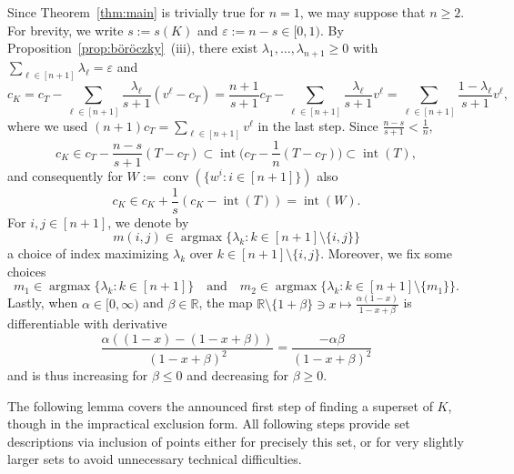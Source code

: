 \documentclass{amsart}
\newcommand\R{\mathbb{R}}
\DeclareMathOperator{\conv}{conv}
\DeclareMathOperator{\inte}{int}
\DeclareMathOperator{\argmax}{argmax}
\begin{document}
Since Theorem~\ref{thm:main} is trivially true for $n = 1$, we may suppose that $n \geq 2$.
For brevity, we write $s := s(K)$ and $\varepsilon := n - s \in [0,1)$.
By Proposition~\ref{prop:böröczky}~(iii),
there exist $\lambda_1, \dots, \lambda_{n+1} \geq 0$ with $\sum_{\ell \in [n+1]} \lambda_\ell = \varepsilon$ and
\begin{equation}\label{eq:c_K}
	c_K
	= c_T - \sum_{\ell \in [n+1]} \frac{\lambda_\ell}{s+1} (v^\ell - c_T)
	= \frac{n+1}{s+1} c_T - \sum_{\ell \in [n+1]} \frac{\lambda_\ell}{s+1} v^\ell
	= \sum_{\ell \in [n+1]} \frac{1 - \lambda_\ell}{s+1} v^\ell,
\end{equation}
where we used $(n+1) c_T = \sum_{\ell \in [n+1]} v^\ell$ in the last step.
Since $\frac{n-s}{s+1} < \frac{1}{n}$,
\begin{equation}\label{eq:c_K_int(T)}
	c_K
	\in c_T - \frac{n-s}{s+1} (T - c_T)
	\subset \inte \bigg( c_T - \frac{1}{n} (T - c_T) \bigg)
	\subset \inte(T),
\end{equation}
and consequently for $W := \conv(\{ w^i : i \in [n+1] \})$ also
\begin{equation}\label{eq:c_K_int(W)}
	c_K
		\in c_K + \frac{1}{s} ( c_K - \inte(T) )
		= \inte(W).
\end{equation}
For $i,j \in [n+1]$, we denote by
\[
	m(i,j) \in \argmax \{ \lambda_k : k \in [n+1] \setminus \{i,j\} \}
\]
a choice of index maximizing $\lambda_k$ over $k \in [n+1] \setminus \{i,j\}$.
Moreover, we fix some choices
\[
	m_1 \in \argmax \{ \lambda_k : k \in [n+1] \} \quad \text{and} \quad m_2 \in \argmax \{ \lambda_k : k \in [n+1] \setminus \{m_1\} \}.
\]
Lastly, when $\alpha \in [0, \infty)$ and $\beta \in \R$,
the map $\R \setminus \{1 + \beta\} \ni x \mapsto \frac{\alpha (1 - x)}{1 - x + \beta}$ is differentiable with derivative
\begin{equation}\label{eq:monotone_quotient}
	\frac{\alpha ( (1-x) - (1 - x + \beta) )}{(1 - x + \beta)^2} = \frac{- \alpha \beta}{(1 - x + \beta)^2}
\end{equation}
and is thus increasing for $\beta \leq 0$ and decreasing for $\beta \geq 0$.

The following lemma covers the announced first step of finding a superset of $K$, though in the impractical exclusion form.
All following steps provide set descriptions via inclusion of points either for precisely this set,
or for very slightly larger sets to avoid unnecessary technical difficulties.
\end{document}
